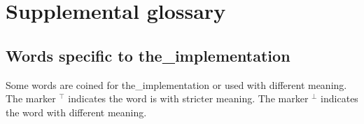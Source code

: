 \documentclass[10pt,b5paper]{article}
\begin{document}

\section{Supplemental glossary}


\subsection{Words specific to the_implementation}

Some words are coined for the_implementation or used with different
meaning.  The marker {$\mbox{}^\top$} indicates the word is with
stricter meaning.  The marker {$\mbox{}^\bot$} indicates the word with
different meaning.
\end{document}
